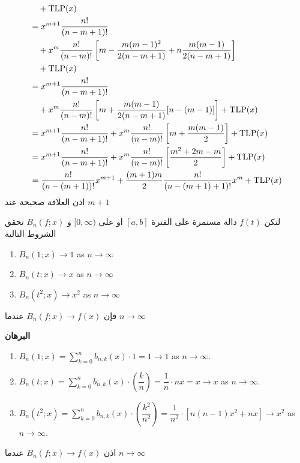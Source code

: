 \begin{enumerate}
\begin{align*}
    &\quad + \operatorname{TLP}(x)\\
    &= x^{m+1} \frac{n!}{(n-m+1)!}\\
    &\quad + x^m \frac{n!}{(n-m)!}\left[m - \frac{m(m-1)^2}{2(n-m+1)} + n\frac{m(m-1)}{2(n-m+1)}\right]\\
    &\quad + \operatorname{TLP}(x)\\
    &= x^{m+1} \frac{n!}{(n-m+1)!}\\
    &\quad + x^m \frac{n!}{(n-m)!}\left[m + \frac{m(m-1)}{2(n-m+1)} [n-(m-1)]\right] + \operatorname{TLP}(x)\\
    &= x^{m+1} \frac{n!}{(n-m+1)!} + x^m \frac{n!}{(n-m)!} \left[m+\frac{m(m-1)}{2}\right] + \operatorname{TLP}(x)\\
    &= x^{m+1} \frac{n!}{(n-m+1)!} + x^m \frac{n!}{(n-m)!} \left[\frac{m^2+2m-m}{2}\right] + \operatorname{TLP}(x)\\
    &= \frac{n!}{(n-(m+1))!}x^{m+1} + \frac{(m+1)m}{2} \frac{n!}{(n-(m+1)+1)!}x^m + \operatorname{TLP}(x)
	\end{align*}
	\endgroup
	اذن العلاقة صحيحة عند $m+1$
\end{enumerate}

\begin{theorem}
	لتكن $f(t)$ دالة مستمرة على الفترة $[a, b]$ او على $[0, \infty)$ و $B_n(f;x)$ تحقق الشروط التالية
	\begin{english}
			\begin{enumerate}
			\item \(B_n(1;x) \to 1\) as \(n \to \infty\)
			\item \(B_n(t;x) \to x\) as \(n \to \infty\)
			\item \(B_n(t^2;x) \to x^2\) as \(n \to \infty\)
		\end{enumerate}
	\end{english} 
	فإن \(B_n(f;x) \to f(x)\) عندما $n \to \infty$
\end{theorem}
\noindent
\textbf{البرهان}
\begin{english}
\begin{enumerate}
	\item \(B_n(1;x) = \sum_{k=0}^{n} b_{n,k}(x)\cdot1 = 1 \to 1\) as \(n\to \infty\).
	\item \(B_n(t;x) = \sum_{k=0}^{n} b_{n,k}(x) \cdot \left(\dfrac{k}{n}\right)= \dfrac{1}{n}\cdot nx = x \to x\) as \(n \to \infty\). 
	\item \(B_n(t^2;x) = \sum_{k=0}^{n} b_{n,k}(x) \cdot \left(\dfrac{k^2}{n^2}\right)= \dfrac{1}{n^2}\cdot[n(n-1)x^2+nx] \to x^2\) as \(n \to \infty\).
\end{enumerate}
	\end{english} 
	اذن \(B_n(f;x) \to f(x)\) عندما $n \to \infty$

